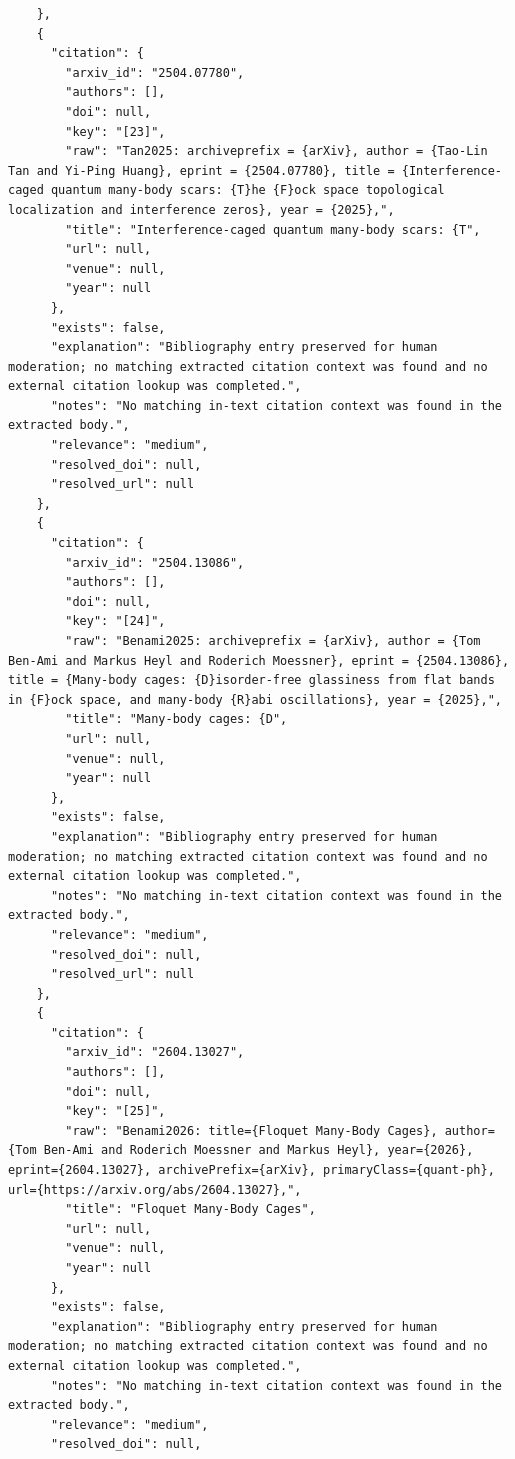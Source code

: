 \documentclass[11pt]{article}
\begin{document}
\begin{verbatim}
    },
    {
      "citation": {
        "arxiv_id": "2504.07780",
        "authors": [],
        "doi": null,
        "key": "[23]",
        "raw": "Tan2025: archiveprefix = {arXiv}, author = {Tao-Lin Tan and Yi-Ping Huang}, eprint = {2504.07780}, title = {Interference-caged quantum many-body scars: {T}he {F}ock space topological localization and interference zeros}, year = {2025},",
        "title": "Interference-caged quantum many-body scars: {T",
        "url": null,
        "venue": null,
        "year": null
      },
      "exists": false,
      "explanation": "Bibliography entry preserved for human moderation; no matching extracted citation context was found and no external citation lookup was completed.",
      "notes": "No matching in-text citation context was found in the extracted body.",
      "relevance": "medium",
      "resolved_doi": null,
      "resolved_url": null
    },
    {
      "citation": {
        "arxiv_id": "2504.13086",
        "authors": [],
        "doi": null,
        "key": "[24]",
        "raw": "Benami2025: archiveprefix = {arXiv}, author = {Tom Ben-Ami and Markus Heyl and Roderich Moessner}, eprint = {2504.13086}, title = {Many-body cages: {D}isorder-free glassiness from flat bands in {F}ock space, and many-body {R}abi oscillations}, year = {2025},",
        "title": "Many-body cages: {D",
        "url": null,
        "venue": null,
        "year": null
      },
      "exists": false,
      "explanation": "Bibliography entry preserved for human moderation; no matching extracted citation context was found and no external citation lookup was completed.",
      "notes": "No matching in-text citation context was found in the extracted body.",
      "relevance": "medium",
      "resolved_doi": null,
      "resolved_url": null
    },
    {
      "citation": {
        "arxiv_id": "2604.13027",
        "authors": [],
        "doi": null,
        "key": "[25]",
        "raw": "Benami2026: title={Floquet Many-Body Cages}, author={Tom Ben-Ami and Roderich Moessner and Markus Heyl}, year={2026}, eprint={2604.13027}, archivePrefix={arXiv}, primaryClass={quant-ph}, url={https://arxiv.org/abs/2604.13027},",
        "title": "Floquet Many-Body Cages",
        "url": null,
        "venue": null,
        "year": null
      },
      "exists": false,
      "explanation": "Bibliography entry preserved for human moderation; no matching extracted citation context was found and no external citation lookup was completed.",
      "notes": "No matching in-text citation context was found in the extracted body.",
      "relevance": "medium",
      "resolved_doi": null,

\end{verbatim}
\end{document}

